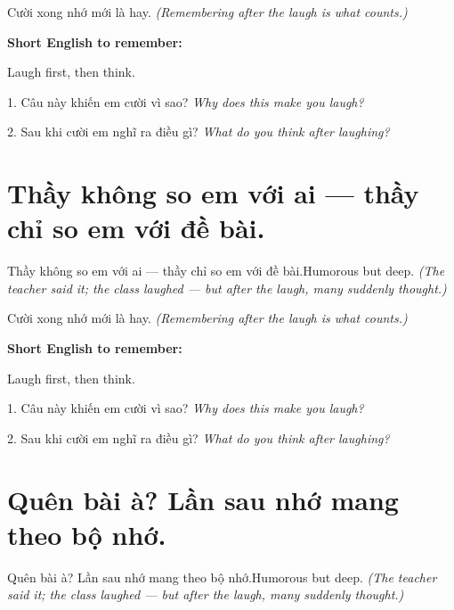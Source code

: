 \begin{baihoc}
Cười xong nhớ mới là hay.
\textit{(Remembering after the laugh is what counts.)}
\end{baihoc}

\begin{ghinhoanh}
\textbf{Short English to remember:}

Laugh first, then think.

\end{ghinhoanh}

\begin{tuhocnhanh}
1. Câu này khiến em cười vì sao? \textit{Why does this make you laugh?}

2. Sau khi cười em nghĩ ra điều gì? \textit{What do you think after laughing?}
\end{tuhocnhanh}
\ngancach


\section{Thầy không so em với ai — thầy chỉ so em với đề bài.}
\begin{truyen}{Thầy không so em với ai — thầy chỉ so em với đề bài.}{Humorous but deep.}
\textit{(The teacher said it; the class laughed — but after the laugh, many suddenly thought.)}
\end{truyen}

\begin{baihoc}
Cười xong nhớ mới là hay.
\textit{(Remembering after the laugh is what counts.)}
\end{baihoc}

\begin{ghinhoanh}
\textbf{Short English to remember:}

Laugh first, then think.

\end{ghinhoanh}

\begin{tuhocnhanh}
1. Câu này khiến em cười vì sao? \textit{Why does this make you laugh?}

2. Sau khi cười em nghĩ ra điều gì? \textit{What do you think after laughing?}
\end{tuhocnhanh}
\ngancach


\section{Quên bài à? Lần sau nhớ mang theo bộ nhớ.}
\begin{truyen}{Quên bài à? Lần sau nhớ mang theo bộ nhớ.}{Humorous but deep.}
\textit{(The teacher said it; the class laughed — but after the laugh, many suddenly thought.)}
\end{truyen}

